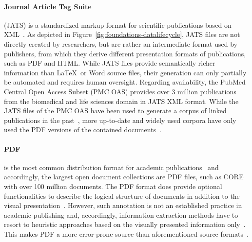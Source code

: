 \paragraph{Journal Article Tag Suite}
(JATS) is a standardized markup format for scientific publications based on XML~\cite{Huh2014}. As depicted in Figure~\ref{fig:foundations-datalifecycle}, JATS files are not directly created by researchers, but are rather an intermediate format used by publishers, from which they derive different presentation formats of publications, such as PDF and HTML. While JATS files provide semantically richer information than \LaTeX\ or Word source files, their generation can only partially be automated and requires human oversight. Regarding availability, the PubMed Central Open Access Subset (PMC OAS) provides over 3 million publications from the biomedical and life sciences domain in JATS XML format. While the JATS files of the PMC OAS have been used to generate a corpus of linked publications in the past~\cite{Gipp2015}, more up-to-date and widely used corpora have only used the PDF versions of the contained documents~\cite{Lo2020}.

\paragraph{PDF}
is the most common distribution format for academic publications~\cite{Johnson2018stm} and accordingly, the largest open document collections are PDF files, such as CORE~\cite{core} with over 100 million documents. The PDF format does provide optional functionalities to describe the logical structure of documents in addition to the visual presentation~\cite{ISO32000-2}. However, such annotation is not an established practice in academic publishing and, accordingly, information extraction methods have to resort to heuristic approaches based on the visually presented information only~\cite{Lopez2009,Nasar2018,Faerber202x}. This makes PDF a more error-prone source than aforementioned source formats~\cite{Bast2017}.


